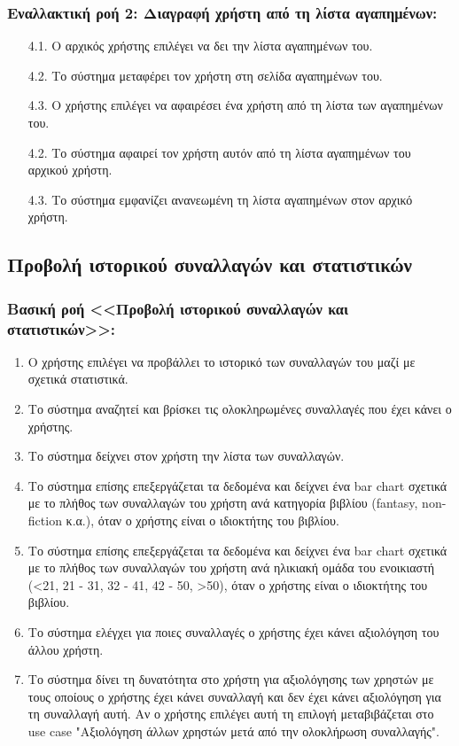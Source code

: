 \documentclass[12pt,a4paper]{article}
\begin{document}
\subsubsection*{Εναλλακτική ροή 2: Διαγραφή χρήστη από τη λίστα αγαπημένων:}
\begin{enumerate}
    \item [4.1.] Ο αρχικός χρήστης επιλέγει να δει την λίστα αγαπημένων του.
    \item [4.2.] Το σύστημα μεταφέρει τον χρήστη στη σελίδα αγαπημένων του.
    \item [4.3.] Ο χρήστης επιλέγει να αφαιρέσει ένα χρήστη από τη λίστα των αγαπημένων του.
    \item [4.2.] Το σύστημα αφαιρεί τον χρήστη αυτόν από τη λίστα αγαπημένων του αρχικού χρήστη.
    \item [4.3.] Το σύστημα εμφανίζει ανανεωμένη τη λίστα αγαπημένων στον αρχικό χρήστη.
\end{enumerate}

\subsection{Προβολή ιστορικού συναλλαγών και στατιστικών}

\subsubsection*{Βασική ροή <<Προβολή ιστορικού συναλλαγών και στατιστικών>>:}
\begin{enumerate}
    \item Ο χρήστης επιλέγει να προβάλλει το ιστορικό των συναλλαγών του μαζί με σχετικά στατιστικά.
    \item Το σύστημα αναζητεί και βρίσκει τις ολοκληρωμένες συναλλαγές που έχει κάνει ο χρήστης.
    \item Το σύστημα δείχνει στον χρήστη την λίστα των συναλλαγών.
    \item Το σύστημα επίσης επεξεργάζεται τα δεδομένα και δείχνει ένα bar chart σχετικά με το πλήθος των συναλλαγών του χρήστη ανά κατηγορία βιβλίου (fantasy, non-fiction κ.α.), όταν ο χρήστης είναι ο ιδιοκτήτης του βιβλίου.
    \item Το σύστημα επίσης επεξεργάζεται τα δεδομένα και δείχνει ένα bar chart σχετικά με το πλήθος των συναλλαγών του χρήστη ανά ηλικιακή ομάδα του ενοικιαστή (<21, 21 - 31, 32 - 41, 42 - 50, >50), όταν ο χρήστης είναι ο ιδιοκτήτης του βιβλίου.
    \item Το σύστημα ελέγχει για ποιες συναλλαγές ο χρήστης έχει κάνει αξιολόγηση του άλλου χρήστη.
    \item Το σύστημα δίνει τη δυνατότητα στο χρήστη για αξιολόγησης των χρηστών με τους οποίους ο χρήστης έχει κάνει συναλλαγή και δεν έχει κάνει αξιολόγηση για τη συναλλαγή αυτή. Αν ο χρήστης επιλέγει αυτή τη επιλογή μεταβιβάζεται στο use case "Αξιολόγηση άλλων χρηστών μετά από την ολοκλήρωση συναλλαγής".
\end{enumerate}
\end{document}
